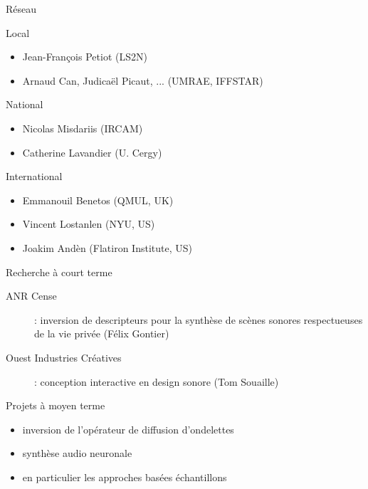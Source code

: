 \begin{frame}{Réseau}
\begin{block}{Local}
\begin{itemize}
\item Jean-François Petiot (LS2N)
\item Arnaud Can, Judicaël Picaut, ... (UMRAE, IFFSTAR)
\end{itemize}
\end{block}
\begin{block}{National}
\begin{itemize}
\item Nicolas Misdariis (IRCAM)
\item Catherine Lavandier (U. Cergy)
\end{itemize}
\end{block}
\begin{block}{International}
\begin{itemize}
\item Emmanouil Benetos (QMUL, UK)
\item Vincent Lostanlen (NYU, US)
\item Joakim Andèn (Flatiron Institute, US)
\end{itemize}
\end{block}
\end{frame}

\begin{frame}{Recherche à court terme}
\begin{description}
\item[ANR Cense]: inversion de descripteurs pour la synthèse de scènes sonores respectueuses de la vie privée (Félix Gontier)
\item[Ouest Industries Créatives]: conception interactive en design sonore (Tom Souaille)
\end{description}
\end{frame}

\begin{frame}{Projets à moyen terme}
\begin{itemize}
\item inversion de l'opérateur de diffusion d'ondelettes
\item synthèse audio neuronale
\item en particulier les approches basées échantillons
\end{itemize}
\end{frame}

